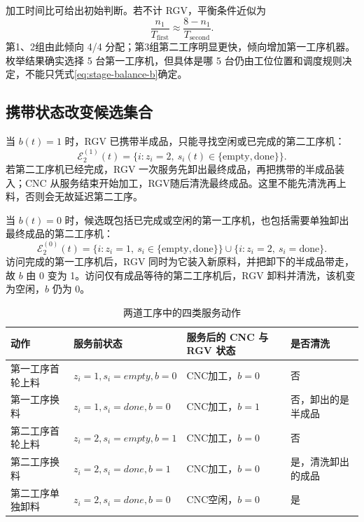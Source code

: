 \documentclass[UTF8,11pt,a4paper]{ctexart}
\begin{document}
加工时间比可给出初始判断。若不计 RGV，平衡条件近似为
\begin{equation}
\frac{n_1}{T_{\mathrm{first}}}\approx \frac{8-n_1}{T_{\mathrm{second}}}.
\label{eq:stage-balance-b}
\end{equation}
第1、2组由此倾向 4/4 分配；第3组第二工序明显更快，倾向增加第一工序机器。枚举结果确实选择 5 台第一工序机，但具体是哪 5 台仍由工位位置和调度规则决定，不能只凭式\eqref{eq:stage-balance-b}确定。

\subsection{携带状态改变候选集合}

当 $b(t)=1$ 时，RGV 已携带半成品，只能寻找空闲或已完成的第二工序机：
\begin{equation}
\mathcal E_2^{(1)}(t)=\{i:z_i=2,\ s_i(t)\in\{\mathrm{empty},\mathrm{done}\}\}.
\label{eq:eligible-carry-b}
\end{equation}
若第二工序机已经完成，RGV 一次服务先卸出最终成品，再把携带的半成品装入；CNC 从服务结束开始加工，RGV随后清洗最终成品。这里不能先清洗再上料，否则会无故延迟第二工序。

当 $b(t)=0$ 时，候选既包括已完成或空闲的第一工序机，也包括需要单独卸出最终成品的第二工序机：
\begin{equation}
\mathcal E_2^{(0)}(t)=
\{i:z_i=1,\ s_i\in\{\mathrm{empty},\mathrm{done}\}\}
\cup\{i:z_i=2,\ s_i=\mathrm{done}\}.
\label{eq:eligible-free-b}
\end{equation}
访问完成的第一工序机后，RGV 同时为它装入新原料，并把卸下的半成品带走，故 $b$ 由 0 变为 1。访问仅有成品等待的第二工序机后，RGV 卸料并清洗，该机变为空闲，$b$ 仍为 0。

\begin{table}[H]
\centering
\caption{两道工序中的四类服务动作}
\label{tab:two-stage-actions-b}
\small
\begin{tabularx}{\textwidth}{p{3.5cm}p{3.2cm}p{4.2cm}X}
\toprule
动作 & 服务前状态 & 服务后的 CNC 与 RGV 状态 & 是否清洗\\
\midrule
第一工序首轮上料 & $z_i=1,s_i=empty,b=0$ & CNC加工，$b=0$ & 否\\
第一工序换料 & $z_i=1,s_i=done,b=0$ & CNC加工，$b=1$ & 否，卸出的是半成品\\
第二工序首轮上料 & $z_i=2,s_i=empty,b=1$ & CNC加工，$b=0$ & 否\\
第二工序换料 & $z_i=2,s_i=done,b=1$ & CNC加工，$b=0$ & 是，清洗卸出的成品\\
第二工序单独卸料 & $z_i=2,s_i=done,b=0$ & CNC空闲，$b=0$ & 是\\
\bottomrule
\end{tabularx}
\end{table}
\end{document}
